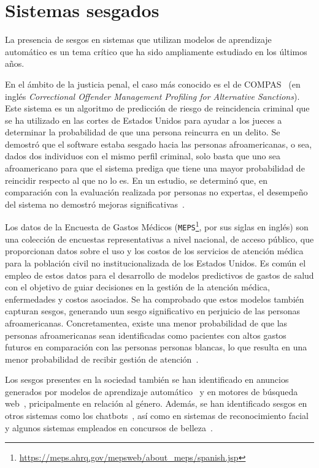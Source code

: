 \section{Sistemas sesgados}

    La presencia de sesgos en sistemas que utilizan modelos de aprendizaje autom\'atico es un tema cr\'itico que ha sido
    ampliamente estudiado en los \'ultimos a\~nos. 
    
    En el \'ambito de la justicia penal, el caso m\'as conocido es el de COMPAS~\parencite{propublica}
    (en ingl\'es \emph{Correctional Offender Management Profiling for Alternative Sanctions}). Este sistema es un algoritmo de predicci\'on
    de riesgo de reincidencia criminal que se ha utilizado en las cortes de Estados Unidos para ayudar a los jueces a determinar la 
    probabilidad de que una persona reincurra en un delito. Se demostr\'o que el software estaba sesgado hacia las personas 
    afroamericanas, o sea, dados dos individuos con el mismo perfil criminal, solo basta que uno sea afroamericano para que el
    sistema prediga que tiene una mayor probabilidad de reincidir respecto al que no lo es. En un estudio, se determin\'o que, 
    en comparaci\'on con la evaluaci\'on realizada por personas no expertas, el desempe\~no del sistema no demostr\'o mejoras 
    significativas~\parencite{compas2}. 
    
    Los datos de la Encuesta de Gastos M\'edicos (\texttt{MEPS}\footnote{\url{https://meps.ahrq.gov/mepsweb/about_meps/spanish.jsp}}, 
    por sus siglas en ingl\'es) son una colecci\'on de encuestas representativas a nivel nacional, de acceso p\'ublico, que proporcionan 
    datos sobre el uso y los costos de los servicios de atenci\'on m\'edica para la poblaci\'on civil no institucionalizada de los Estados Unidos. 
    Es com\'un el empleo de estos datos para el desarrollo de modelos predictivos de gastos de salud con el objetivo de guiar decisiones 
    en la gesti\'on de la atenci\'on m\'edica, enfermedades y costos asociados. Se ha comprobado que estos modelos tambi\'en capturan sesgos, 
    generando uun sesgo significativo en perjuicio de las personas afroamericanas. Concretamentea, existe una menor probabilidad de que 
    las personas afroamericanas sean identificadas como pacientes con altos gastos futuros en comparaci\'on con las personas personas blancas, 
    lo que resulta en una menor probabilidad de recibir gesti\'on de atenci\'on~\parencite{understanding}.

    Los sesgos presentes en la sociedad tambi\'en se han identificado en anuncios generados por modelos de aprendizaje 
    autom\'atico~\parencite{sweeney2013discrimination,datta2015automated} y en motores de b\'usqueda web~\parencite{unequal_rep}, 
    pricipalmente en relaci\'on al g\'enero. Adem\'as, se han identificado sesgos en otros sistemas como los 
    chatbots~\parencite{chatbot_bias}, as\'i como en sistemas de reconocimiento facial~\parencite{facial_bias} y algunos 
    sistemas empleados en concursos de belleza~\parencite{beauty}.

